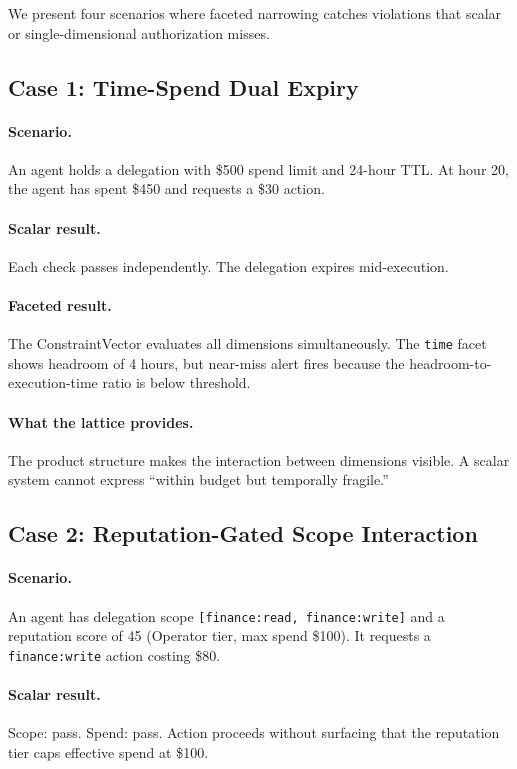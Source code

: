 \documentclass[sigconf,nonacm]{acmart}
\begin{document}
We present four scenarios where faceted narrowing catches violations that scalar or
single-dimensional authorization misses.

\subsection{Case 1: Time-Spend Dual Expiry}

\paragraph{Scenario.} An agent holds a delegation with \$500 spend limit and 24-hour TTL.
At hour 20, the agent has spent \$450 and requests a \$30 action.

\paragraph{Scalar result.} Each check passes independently. The delegation expires mid-execution.

\paragraph{Faceted result.} The ConstraintVector evaluates all dimensions simultaneously.
The \texttt{time} facet shows headroom of 4 hours, but near-miss alert fires because
the headroom-to-execution-time ratio is below threshold.

\paragraph{What the lattice provides.} The product structure makes the interaction between
dimensions visible. A scalar system cannot express ``within budget but temporally fragile.''

\subsection{Case 2: Reputation-Gated Scope Interaction}

\paragraph{Scenario.} An agent has delegation scope \texttt{[finance:read, finance:write]}
and a reputation score of 45 (Operator tier, max spend \$100). It requests a
\texttt{finance:write} action costing \$80.

\paragraph{Scalar result.} Scope: pass. Spend: pass. Action proceeds without surfacing
that the reputation tier caps effective spend at \$100.
\end{document}
